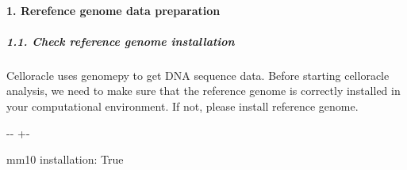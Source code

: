 \documentclass[letterpaper,10pt,english]{sphinxmanual}
\newlength\nbsphinxcodecellspacing
\begin{document}
\paragraph{1. Rerefence genome data preparation}
\label{\detokenize{notebooks/02_motif_scan/02_atac_peaks_to_TFinfo_with_celloracle_20200801:1.-Rerefence-genome-data-preparation}}

\subparagraph{1.1. Check reference genome installation}
\label{\detokenize{notebooks/02_motif_scan/02_atac_peaks_to_TFinfo_with_celloracle_20200801:1.1.-Check-reference-genome-installation}}
Celloracle uses genomepy to get DNA sequence data. Before starting celloracle analysis, we need to make sure that the reference genome is correctly installed in your computational environment. If not, please install reference genome.

{
\begin{sphinxVerbatim}[commandchars=\\\{\}]
\llap{\color{nbsphinxin}[4]:\,\hspace{\fboxrule}\hspace{\fboxsep}}
  

  
  
\end{sphinxVerbatim}
}

{

\kern-\sphinxverbatimsmallskipamount\kern-\baselineskip
\kern+\FrameHeightAdjust\kern-\fboxrule
\vspace{\nbsphinxcodecellspacing}

\begin{sphinxVerbatim}[commandchars=\\\{\}]
mm10 installation:  True
\end{sphinxVerbatim}
}
\end{document}
